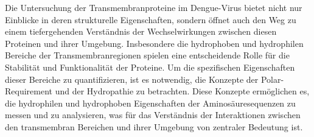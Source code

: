 \documentclass[german,version-2022-01]{uzl-thesis}
\begin{document}
Die Untersuchung der Transmembranproteine im Dengue-Virus bietet nicht nur Einblicke in deren strukturelle Eigenschaften, sondern \"offnet auch den Weg zu einem tiefergehenden Verst\"andnis der Wechselwirkungen zwischen diesen Proteinen und ihrer Umgebung. Insbesondere die hydrophoben und hydrophilen Bereiche der Transmembranregionen spielen eine entscheidende Rolle f\"ur die Stabilit\"at und Funktionalit\"at der Proteine. Um die spezifischen Eigenschaften dieser Bereiche zu quantifizieren, ist es notwendig, die Konzepte der Polar-Requirement und der Hydropathie zu betrachten. Diese Konzepte erm\"oglichen es, die hydrophilen und hydrophoben Eigenschaften der Aminos\"auresequenzen zu messen und zu analysieren, was f\"ur das Verst\"andnis der Interaktionen zwischen den transmembran Bereichen und ihrer Umgebung von zentraler Bedeutung ist.
\end{document}
